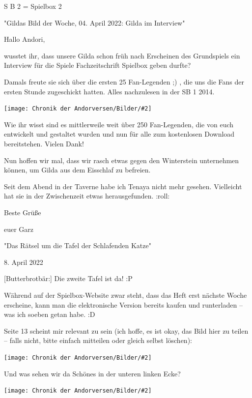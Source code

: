 \documentclass[10pt, a4paper, oneside]{book}
\newcommand{\bildmitts}[2][height=0.32\textwidth,width=0.48\textwidth,keepaspectratio]{%
    \begin{center}
        \texttt{[image: Chronik der Andorversen/Bilder/\#2]}
    \end{center}
}
\begin{document}
\begin{multicols}{2}
S B 2 = Spielbox 2



\begin{center}
    "Gildas Bild der Woche, 04. April 2022: Gilda im Interview"
\end{center}


Hallo Andori,

wusstet ihr, dass unsere Gilda schon früh nach Erscheinen des Grundspiels ein Interview für die Spiele Fachzeitschrift Spielbox geben durfte?

Damals freute sie sich über die ersten 25 Fan-Legenden ;) , die uns die Fans der ersten Stunde zugeschickt hatten. Alles nachzulesen in der SB 1 2014.

\bildmitts{AA2022 Gilda im Interview.jpeg}

Wie ihr wisst sind es mittlerweile weit über 250 Fan-Legenden, die von euch entwickelt und gestaltet wurden und nun für alle zum kostenlosen Download bereitstehen. Vielen Dank!

Nun hoffen wir mal, dass wir rasch etwas gegen den Winterstein unternehmen können, um Gilda aus dem Eisschlaf zu befreien.

Seit dem Abend in der Taverne habe ich Tenaya nicht mehr gesehen. Vielleicht hat sie in der Zwischenzeit etwas herausgefunden. :roll:

Beste Grüße

euer Garz





\begin{center}
    "Das Rätsel um die Tafel der Schlafenden Katze"

    8. April 2022
\end{center}


[Butterbrotbär:] Die zweite Tafel ist da! :P

Während auf der Spielbox-Website zwar steht, dass das Heft erst nächste Woche erscheine, kann man die elektronische Version bereits kaufen und runterladen – was ich soeben getan habe. :D

Seite 13 scheint mir relevant zu sein (ich hoffe, es ist okay, das Bild hier zu teilen – falls nicht, bitte einfach mitteilen oder gleich selbst löschen):

\bildmitts{AA2022 Rätsel um Tafel 1.png}

Und was sehen wir da Schönes in der unteren linken Ecke?

\bildmitts{AA2022 Rätsel um Tafel 2.png}


\end{multicols}
\end{document}
